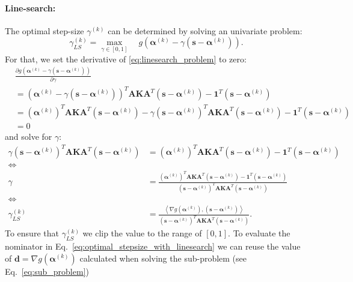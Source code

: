 \documentclass[10p]{article}
\newcommand{\balpha}{\boldsymbol{\alpha}}
\newcommand{\bones}{\mathbf{1}}
\begin{document}
\paragraph{Line-search:}
The optimal step-size $\gamma^{(k)}$ can be determined by solving an univariate problem:
\begin{equation}
    \gamma_{LS}^{(k)}=\underset{\gamma\in[0,1]}{\max}\quad g\left(\balpha^{(k)}-\gamma\left(\mathbf{s}-\balpha^{(k)}\right)\right).
    \label{eq:linesearch_problem}
\end{equation}
For that, we set the derivative of \eqref{eq:linesearch_problem} to zero: 
\begin{align}
    &\frac{\partial g\left(\balpha^{(k)}-\gamma\left(\mathbf{s}-\balpha^{(k)}\right)\right)}{\partial\gamma}\\
        &=\left(\balpha^{(k)}-\gamma\left(\mathbf{s}-\balpha^{(k)}\right)\right)^T\mathbf{A}\mathbf{K}\mathbf{A}^T\left(\mathbf{s}-\balpha^{(k)}\right)-\bones^T\left(\mathbf{s}-\balpha^{(k)}\right)\\
        &=\left(\balpha^{(k)}\right)^T\mathbf{A}\mathbf{K}\mathbf{A}^T\left(\mathbf{s}-\balpha^{(k)}\right)
            -\gamma\left(\mathbf{s}-\balpha^{(k)}\right)^T\mathbf{A}\mathbf{K}\mathbf{A}^T\left(\mathbf{s}-\balpha^{(k)}\right)
            -\bones^T\left(\mathbf{s}-\balpha^{(k)}\right)\\
        &=0
\end{align}
and solve for $\gamma$:
\begin{align}
    \gamma\left(\mathbf{s}-\balpha^{(k)}\right)^T\mathbf{A}\mathbf{K}\mathbf{A}^T\left(\mathbf{s}-\balpha^{(k)}\right)
    &=\left(\balpha^{(k)}\right)^T\mathbf{A}\mathbf{K}\mathbf{A}^T\left(\mathbf{s}-\balpha^{(k)}\right)
            -\bones^T\left(\mathbf{s}-\balpha^{(k)}\right)\\
    \Leftrightarrow\\
    \gamma&=\frac{\left(\balpha^{(k)}\right)^T\mathbf{A}\mathbf{K}\mathbf{A}^T\left(\mathbf{s}-\balpha^{(k)}\right)
            -\bones^T\left(\mathbf{s}-\balpha^{(k)}\right)}{\left(\mathbf{s}-\balpha^{(k)}\right)^T\mathbf{A}\mathbf{K}\mathbf{A}^T\left(\mathbf{s}-\balpha^{(k)}\right)}\\
    \Leftrightarrow\\
    \gamma_{LS}^{(k)}&=\frac{\left\langle\nabla g\left(\balpha^{(k)}\right),\left(\mathbf{s}-\balpha^{(k)}\right)\right\rangle}{\left(\mathbf{s}-\balpha^{(k)}\right)^T\mathbf{A}\mathbf{K}\mathbf{A}^T\left(\mathbf{s}-\balpha^{(k)}\right)}\label{eq:optimal_stepsize_with_linesearch}.
\end{align}
To ensure that $\gamma_{LS}^{(k)}$ we clip the value to the range of $[0,1]$. To evaluate the nominator in Eq.~\eqref{eq:optimal_stepsize_with_linesearch} we can reuse the value of $\mathbf{d}=\nabla g\left(\balpha^{(k)}\right)$ calculated when solving the sub-problem (see Eq.~\eqref{eq:sub_problem})
\end{document}
